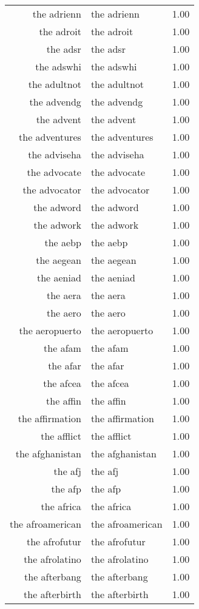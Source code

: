 \begin{table}[ht]
\begin{tabular}{rlr}
  the adrienn & the adrienn & 1.00 \\ 
  the adroit & the adroit & 1.00 \\ 
  the adsr & the adsr & 1.00 \\ 
  the adswhi & the adswhi & 1.00 \\ 
  the adultnot & the adultnot & 1.00 \\ 
  the advendg & the advendg & 1.00 \\ 
  the advent & the advent & 1.00 \\ 
  the adventures & the adventures & 1.00 \\ 
  the adviseha & the adviseha & 1.00 \\ 
  the advocate & the advocate & 1.00 \\ 
  the advocator & the advocator & 1.00 \\ 
  the adword & the adword & 1.00 \\ 
  the adwork & the adwork & 1.00 \\ 
  the aebp & the aebp & 1.00 \\ 
  the aegean & the aegean & 1.00 \\ 
  the aeniad & the aeniad & 1.00 \\ 
  the aera & the aera & 1.00 \\ 
  the aero & the aero & 1.00 \\ 
  the aeropuerto & the aeropuerto & 1.00 \\ 
  the afam & the afam & 1.00 \\ 
  the afar & the afar & 1.00 \\ 
  the afcea & the afcea & 1.00 \\ 
  the affin & the affin & 1.00 \\ 
  the affirmation & the affirmation & 1.00 \\ 
  the afflict & the afflict & 1.00 \\ 
  the afghanistan & the afghanistan & 1.00 \\ 
  the afj & the afj & 1.00 \\ 
  the afp & the afp & 1.00 \\ 
  the africa & the africa & 1.00 \\ 
  the afroamerican & the afroamerican & 1.00 \\ 
  the afrofutur & the afrofutur & 1.00 \\ 
  the afrolatino & the afrolatino & 1.00 \\ 
  the afterbang & the afterbang & 1.00 \\ 
  the afterbirth & the afterbirth & 1.00 \\ 

\end{tabular}
\end{table}
